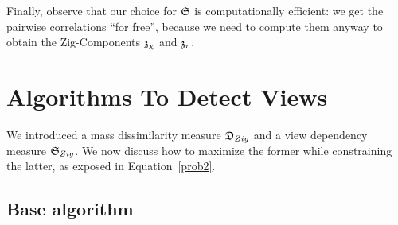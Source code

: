 Finally, observe that our choice for $\mathfrak{S}$ is computationally efficient: we
get the pairwise correlations ``for free'', because we need to compute them
anyway to obtain the Zig-Components $\mathfrak{z}_{\chi}$ and $\mathfrak{z}_r$.

\section{Algorithms To Detect Views}
\label{sec:algorithm}

We introduced a mass dissimilarity measure $\mathfrak{D}_{Zig}$ and a view dependency
measure $\mathfrak{S}_{Zig}$. We now discuss how to maximize the former while
constraining the latter, as exposed in Equation~\ref{prob2}.

\subsection{Base algorithm}
\label{sec:overview}

